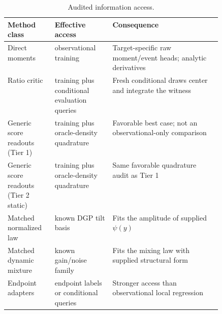 \begin{table}[H]\centering\small
\caption{Audited information access.}
\begin{tabularx}{\linewidth}{p{0.22\linewidth}p{0.27\linewidth}X}\toprule
Method class & Effective access & Consequence\\\midrule
Direct moments & observational training & Target-specific raw moment/event heads; analytic derivatives \\
Ratio critic & training plus conditional evaluation queries & Fresh conditional draws center and integrate the witness \\
Generic score readouts (Tier 1) & training plus oracle-density quadrature & Favorable best case; not an observational-only comparison \\
Generic score readouts (Tier 2 static) & training plus oracle-density quadrature & Same favorable quadrature audit as Tier 1 \\
Matched normalized law & known DGP tilt basis & Fits the amplitude of supplied $\psi(y)$ \\
Matched dynamic mixture & known gain/noise family & Fits the mixing law with supplied structural form \\
Endpoint adapters & endpoint labels or conditional queries & Stronger access than observational local regression \\
\bottomrule\end{tabularx}\end{table}
